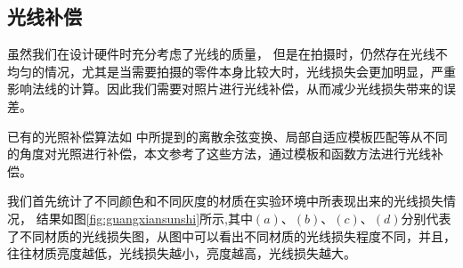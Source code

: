 \subsection{光线补偿}

虽然我们在设计硬件时充分考虑了光线的质量，
但是在拍摄时，仍然存在光线不均匀的情况，尤其是当需要拍摄的零件本身比较大时，光线损失会更加明显，严重影响法线的计算。因此我们需要对照片进行光线补偿，从而减少光线损失带来的误差。

已有的光照补偿算法如
\cite{贾灵芝2008基于自适应光线补偿的人脸检测算法,chen2006illumination,ruiz2008illumination,malassiotis2005robust,zheng2008intra,wiegand2003overview,tan2006intra,tan2007intra}中所提到的离散余弦变换、局部自适应模板匹配等从不同的角度对光照进行补偿，本文参考了这些方法，通过模板和函数方法进行光线补偿。

我们首先统计了不同颜色和不同灰度的材质在实验环境中所表现出来的光线损失情况，
结果如图\ref{fig:guangxiansunshi}所示,其中$(a)$、$(b)$、$(c)$、$(d)$分别代表了不同材质的光线损失图，从图中可以看出不同材质的光线损失程度不同，并且，往往材质亮度越低，光线损失越小，亮度越高，光线损失越大。

